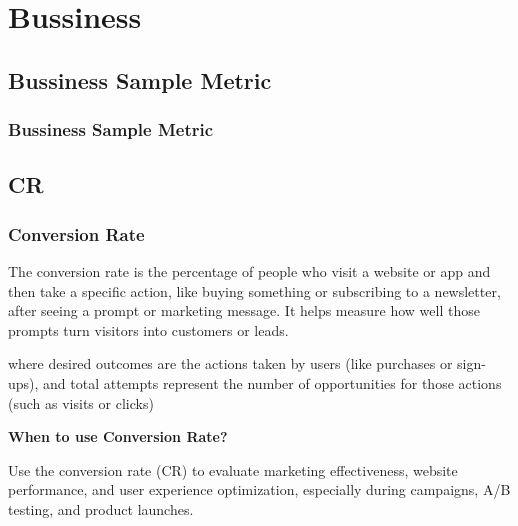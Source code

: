 \chapter{Bussiness}


\clearpage
\thispagestyle{businessstyle}
\section{Bussiness Sample Metric}
\subsection{Bussiness Sample Metric}

\clearpage
\thispagestyle{businessstyle}

\section{CR}

\subsection{Conversion Rate}
The conversion rate is the percentage of people who visit a website or app and then take a specific action, like buying something or subscribing to a newsletter, after seeing a prompt or marketing message. It helps measure how well those prompts turn visitors into customers or leads.

\begin{center}
\end{center}

\vspace{-10pt}

where desired outcomes are the actions taken by users (like purchases or sign-ups), and total attempts represent the number of opportunities for those actions (such as visits or clicks)

\textbf{When to use Conversion Rate?}

Use the conversion rate (CR) to evaluate marketing effectiveness, website performance, and user experience optimization, especially during campaigns, A/B testing, and product launches.

